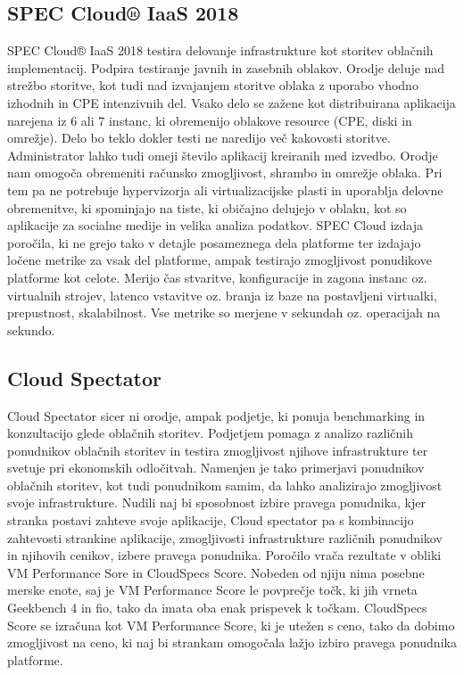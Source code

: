 \subsection{SPEC Cloud® IaaS 2018}

SPEC Cloud® IaaS 2018 testira delovanje infrastrukture kot storitev oblačnih implementacij. Podpira testiranje javnih in zasebnih oblakov. Orodje deluje nad strežbo storitve, kot tudi nad izvajanjem storitve oblaka z uporabo vhodno izhodnih in CPE intenzivnih del. Vsako delo se zažene kot distribuirana aplikacija narejena iz 6 ali 7 instanc, ki obremenijo oblakove resource (CPE, diski in omrežje). Delo bo teklo dokler testi ne naredijo več kakovosti storitve. Administrator lahko tudi omeji število aplikacij kreiranih med izvedbo.
Orodje nam omogoča obremeniti računsko zmogljivost, shrambo in omrežje oblaka. Pri tem pa ne potrebuje hypervizorja ali virtualizacijske plasti in uporablja delovne obremenitve, ki spominjajo na tiste, ki običajno delujejo v oblaku, kot so aplikacije za socialne medije in velika analiza podatkov.
SPEC Cloud izdaja poročila, ki ne grejo tako v detajle posameznega dela platforme ter izdajajo ločene metrike za vsak del platforme, ampak testirajo zmogljivost ponudikove platforme kot celote. Merijo čas stvaritve, konfiguracije in zagona instanc oz. virtualnih strojev, latenco vstavitve oz. branja iz baze na postavljeni virtualki, prepustnost, skalabilnost. Vse metrike so merjene v sekundah oz. operacijah na sekundo.

\subsection{Cloud Spectator}

Cloud Spectator sicer ni orodje, ampak podjetje, ki ponuja benchmarking in konzultacijo glede oblačnih storitev. Podjetjem pomaga z analizo različnih ponudnikov oblačnih storitev in testira zmogljivost njihove infrastrukture ter svetuje pri ekonomskih odločitvah. Namenjen je tako primerjavi ponudnikov oblačnih storitev, kot tudi ponudnikom samim, da lahko analizirajo zmogljivost svoje infrastrukture. Nudili naj bi sposobnost izbire pravega ponudnika, kjer stranka postavi zahteve svoje aplikacije, Cloud spectator pa s kombinacijo zahtevosti strankine aplikacije, zmogljivosti infrastrukture različnih ponudnikov in njihovih cenikov, izbere pravega ponudnika.
Poročilo vrača rezultate v obliki VM Performance Sore in CloudSpecs Score. Nobeden od njiju nima posebne merske enote, saj je VM Performance Score le povprečje točk, ki jih vrneta Geekbench 4 in fio, tako da imata oba enak prispevek k točkam. CloudSpecs Score se izračuna kot VM Performance Score, ki je utežen s ceno, tako da dobimo zmogljivost na ceno, ki naj bi strankam omogočala lažjo izbiro pravega ponudnika platforme.

